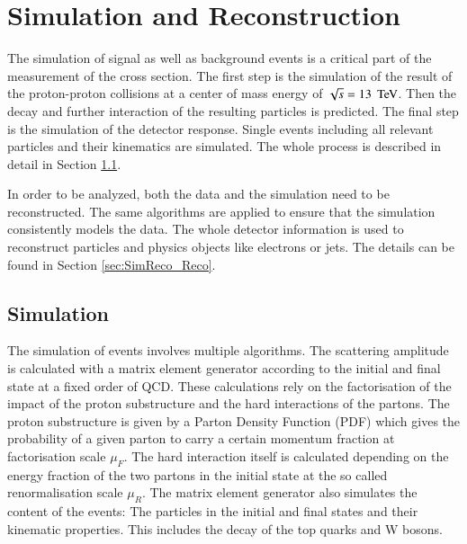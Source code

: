 
\chapter{Simulation and Reconstruction}

The simulation of signal as well as background events is a critical part of the measurement
of the \ttbar cross section. The first step is the simulation of the result of the proton-proton 
collisions at a center of mass energy of $\sqrt{s} = 13 \; \,\text{Te\hspace{-.08em}V}$. Then the decay and further interaction 
of the resulting particles is predicted. The final step is the simulation of the detector response.
Single events including all relevant particles and their kinematics are simulated.
The whole process is described in detail in Section \ref{sec:SimReco_Sim}.

In order to be analyzed, both the data and the simulation need to be reconstructed. The same algorithms are applied to ensure
that the simulation consistently models the data. 
The whole detector information is used to reconstruct particles and physics objects like electrons or jets.
The details can be found in Section \ref{sec:SimReco_Reco}. 


\section{Simulation}
\label{sec:SimReco_Sim}

The simulation of events involves multiple algorithms.
The scattering amplitude is calculated with a matrix element generator according to the initial and final state at a fixed order of QCD. These calculations rely on the factorisation of the impact of the proton substructure and the hard 
interactions of the partons. The proton substructure is given by a Parton Density Function (PDF) which gives the probability of a given parton to carry a certain momentum fraction 
at factorisation scale $\mu_F$. The hard interaction itself is calculated depending on the energy fraction of the two partons in the initial state at the so called renormalisation scale $\mu_R$.
The matrix element generator also simulates the content of the events: The particles in the initial and final states and their kinematic properties.
This includes the decay of the top quarks and W bosons. 

